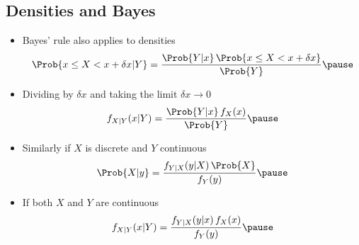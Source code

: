 \begin{slide}
\section[-2]{Densities and Bayes}

\begin{PauseHighLight}\squeeze
  \begin{itemize}
  \item Bayes' rule also applies to densities
    {\small \begin{align*}
      \Prob{x\leq X < x +\delta x| Y} = \frac{\Prob{Y | x} \,
      \Prob{x\leq X < x +\delta x}}{\Prob{Y}}\pause
    \end{align*}}
  \item Dividing by $\delta x$ and taking the limit $\delta x\rightarrow
    0$
    {\small \begin{align*}
      f_{X|Y}(x|Y) = \frac{\Prob{Y|x}\,f_X(x)}{\Prob{Y}}\pause
    \end{align*}}
  \item Similarly if $X$ is discrete and $Y$ continuous
    {\small \begin{align*}
      \Prob{X|y} = \frac{f_{Y|X}(y|X)\,\Prob{X}}{f_Y(y)}\pause
    \end{align*}}
  \item If both $X$ and $Y$ are continuous
    {\small \begin{align*}
      f_{X|Y}(x|Y) = \frac{f_{Y|X}(y|x)\,f_X(x)}{f_Y(y)}\pause
    \end{align*}}
  \end{itemize}
\end{PauseHighLight}
\end{slide}


